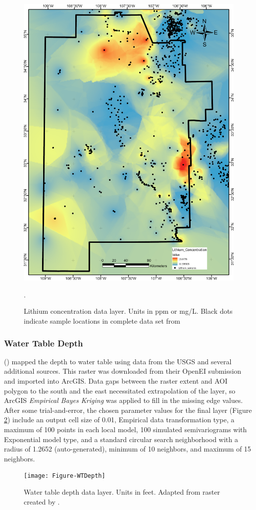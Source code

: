 \begin{figure}[!htp]
\centering
\includegraphics[scale=.50]{templates/images/Figure-Lithium.png}
\caption[Lithium concentration data layer]{Lithium concentration data layer. Units in ppm or mg/L. Black dots indicate sample locations in complete data set from \protect\citep{bielicki_hydrogeolgic_2015}}.
\label{fig:feat_lithium}
\end{figure}

\subsubsection{Water Table Depth}

\citeauthor{bielicki_hydrogeolgic_2015} (\citeyear{bielicki_hydrogeolgic_2015}) mapped the depth to water table using data from the USGS and several additional sources. This raster was downloaded from their OpenEI submission \citep{kelley_geothermal_2015} and imported into ArcGIS. Data gaps between the raster extent and AOI polygon to the south and the east necessitated extrapolation of the layer, so ArcGIS \textit{Empirical Bayes Kriging} was applied to fill in the missing edge values. After some trial-and-error, the chosen parameter values for the final layer (Figure \ref{fig:feat_wtdepth}) include an output cell size of 0.01, Empirical data transformation type, a maximum of 100 points in each local model, 100 simulated semivariograms with Exponential model type, and a standard circular search neighborhood with a radius of 1.2652 (auto-generated), minimum of 10 neighbors, and maximum of 15 neighbors.

\begin{figure}[!htp]
\centering
\texttt{[image: Figure-WTDepth]}
\caption[Water table depth data layer]{Water table depth data layer. Units in feet. Adapted from raster created by \protect\citep{bielicki_hydrogeolgic_2015}.}
\label{fig:feat_wtdepth}
\end{figure}